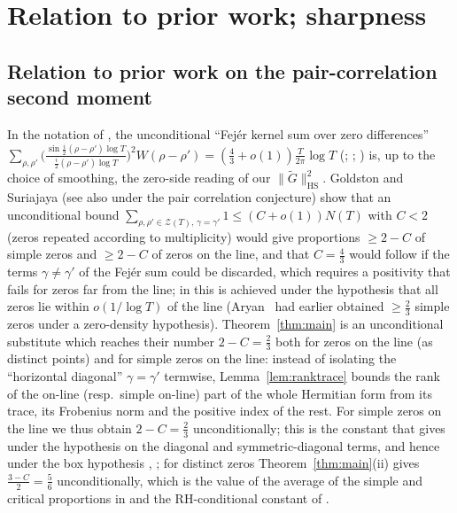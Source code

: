 \documentclass[11pt]{amsart}
\theoremstyle{definition}
\theoremstyle{remark}
\numberwithin{equation}{section}
\newcommand{\Gt}{\widetilde{G}}
\newcommand{\HS}{\mathrm{HS}}
\begin{document}
\section{Relation to prior work; sharpness}\label{sec:variants}

\subsection{Relation to prior work on the pair-correlation second moment}\label{subsec:GS}
In the notation of \cite{GS25,GS26}, the unconditional ``Fej\'er kernel sum over zero differences'' $\sum_{\rho,\rho'}\bigl(\frac{\sin\frac i2(\rho-\rho')\log T}{\frac i2(\rho-\rho')\log T}\bigr)^2W(\rho-\rho')=(\frac43+o(1))\frac T{2\pi}\log T$ (\cite[Cor.~1.4]{Ary22}; \cite[Theorem~1]{BGSTB24}; \cite[Lemma~2]{GS26}) is, up to the choice of smoothing, the zero-side reading of our $\|\Gt\|_{\HS}^2$. Goldston and Suriajaya \cite[Theorem~2]{GS25} (see also \cite{GLSS25} under the pair correlation conjecture) show that an unconditional bound $\sum_{\rho,\rho'\in\mathcal Z(T),\,\gamma=\gamma'}1\le(C+o(1))N(T)$ with $C<2$ (zeros repeated according to multiplicity) would give proportions $\ge2-C$ of simple zeros and $\ge2-C$ of zeros on the line, and that $C=\frac43$ would follow if the terms $\gamma\ne\gamma'$ of the Fej\'er sum could be discarded, which requires a positivity that fails for zeros far from the line; in \cite{BGSTB25,GS26} this is achieved under the hypothesis that all zeros lie within $o(1/\log T)$ of the line (Aryan~\cite[Cor.~1.5]{Ary22} had earlier obtained $\ge\tfrac23$ simple zeros under a zero-density hypothesis). Theorem~\ref{thm:main} is an unconditional substitute which reaches their number $2-C=\frac23$ both for zeros on the line (as distinct points) and for simple zeros on the line: instead of isolating the ``horizontal diagonal'' $\gamma=\gamma'$ termwise, Lemma~\ref{lem:ranktrace} bounds the rank of the on-line (resp.\ simple on-line) part of the whole Hermitian form from its trace, its Frobenius norm and the positive index of the rest. For simple zeros on the line we thus obtain $2-C=\frac23$ unconditionally; this is the constant that \cite[Theorem~3(i)]{GS25} gives under the hypothesis \cite[(6.1)]{GS25} on the diagonal and symmetric-diagonal terms, and hence under the box hypothesis \cite[Theorem~4]{GS25}, \cite[Theorem~1]{GS26}; for distinct zeros Theorem~\ref{thm:main}(ii) gives $\tfrac{3-C}2=\frac56$ unconditionally, which is the value of the average of the simple and critical proportions in \cite[Theorem~3(ii)]{GS25} and the RH-conditional constant of \cite[(1.2)]{CGG98}.
\end{document}
